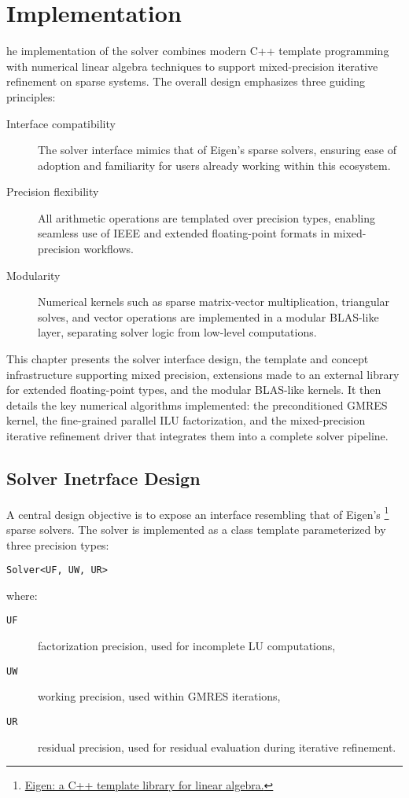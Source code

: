 \chapter{Implementation}
\label{cha:implementation}

he implementation of the solver combines modern C++ template programming with
numerical linear algebra techniques to support mixed-precision iterative
refinement on sparse systems. The overall design emphasizes three guiding
principles:

\begin{description}
\item[Interface compatibility] The solver interface mimics that of Eigen’s sparse
  solvers, ensuring ease of adoption and familiarity for users already working
  within this ecosystem.
\item[Precision flexibility] All arithmetic operations are templated over precision
  types, enabling seamless use of IEEE and extended floating-point formats in
  mixed-precision workflows.
\item[Modularity] Numerical kernels such as sparse matrix-vector multiplication,
  triangular solves, and vector operations are implemented in a modular
  BLAS-like layer, separating solver logic from low-level computations.
\end{description}

This chapter presents the solver interface design, the template and concept
infrastructure supporting mixed precision, extensions made to an external
library for extended floating-point types, and the modular BLAS-like kernels. It
then details the key numerical algorithms implemented: the preconditioned GMRES
kernel, the fine-grained parallel ILU factorization, and the mixed-precision
iterative refinement driver that integrates them into a complete solver
pipeline.

\section{Solver Inetrface Design}
\label{sec:solv-inetrf-design}

A central design objective is to expose an interface resembling that of Eigen's
\footnote{\href{https://eigen.tuxfamily.org/index.php?title=Main_Page}{Eigen: a
    C++ template library for linear algebra.}} sparse solvers. The solver is
implemented as a class template parameterized by three precision types:
\begin{center}
  \texttt{Solver<UF, UW, UR>}
\end{center}
where:
\begin{description}
\item[\texttt{UF}] factorization precision, used for incomplete LU computations,
\item[\texttt{UW}] working precision, used within GMRES iterations,
\item[\texttt{UR}] residual precision, used for residual evaluation during iterative
  refinement.
\end{description}

